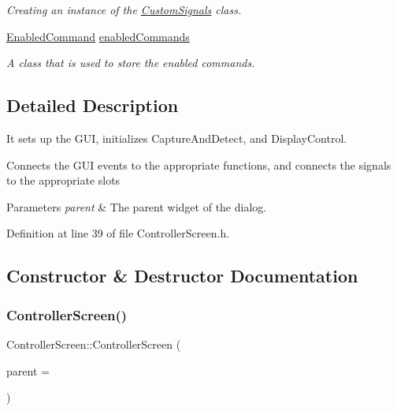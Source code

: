 \begin{DoxyCompactItemize}
\begin{DoxyCompactList}\small\item\em Creating an instance of the \hyperlink{struct_custom_signals}{Custom\+Signals} class. \end{DoxyCompactList}\item 
\hyperlink{class_gesture_detection_1_1_enabled_command}{Enabled\+Command} \hyperlink{class_controller_screen_a96533700d5a3a0593d9b9d24a724b16b}{enabled\+Commands}
\begin{DoxyCompactList}\small\item\em A class that is used to store the enabled commands. \end{DoxyCompactList}\end{DoxyCompactItemize}


\subsection{Detailed Description}
It sets up the G\+UI, initializes Capture\+And\+Detect, and Display\+Control. 

Connects the G\+UI events to the appropriate functions, and connects the signals to the appropriate slots


\begin{DoxyParams}{Parameters}
{\em parent} & The parent widget of the dialog. \\
\hline
\end{DoxyParams}


Definition at line 39 of file Controller\+Screen.\+h.



\subsection{Constructor \& Destructor Documentation}
\mbox{\label{class_controller_screen_aecef7737326dbb37945e6a9eac6dcede}} 
\subsubsection{\texorpdfstring{Controller\+Screen()}{ControllerScreen()}}
{\footnotesize\ttfamily Controller\+Screen\+::\+Controller\+Screen (\begin{DoxyParamCaption}\item[{Q\+Widget $\ast$}]{parent = {} }\end{DoxyParamCaption})\hspace{0.3cm}{\ttfamily [explicit]}}

